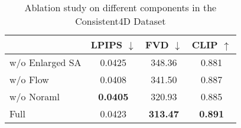 \begin{wraptable}{l}{0.5\textwidth}

\caption{Ablation study on different components in the Consistent4D Dataset}
\setlength{\tabcolsep}{0.25em} %
\centering
\begin{tabular}{lccc}
\toprule
 & LPIPS $\downarrow$ &  FVD $\downarrow$  & CLIP $\uparrow$    \\
\midrule
w/o Enlarged SA & 0.0425 & 348.36  & 0.881 \\
w/o Flow & 0.0408 & 341.50 & 0.887 \\
w/o Noraml  & \textbf{0.0405} & 320.93 & 0.885  \\
Full & 0.0423 &  \textbf{313.47} & \textbf{0.891}  \\
\bottomrule
\end{tabular}%
\label{tab:ablation}

\vspace{3pt}

\end{wraptable}